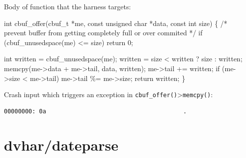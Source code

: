 \documentclass[
  a4paper,
]{scrreprt}
\newenvironment{Shaded}{\begin{snugshade}}{\end{snugshade}}
\newcommand{\CommentTok}[1]{\textcolor[rgb]{0.41,0.41,0.41}{#1}}
\newcommand{\ControlFlowTok}[1]{\textcolor[rgb]{0.85,0.12,0.09}{#1}}
\newcommand{\DataTypeTok}[1]{\textcolor[rgb]{0.47,0.16,0.63}{#1}}
\newcommand{\DecValTok}[1]{\textcolor[rgb]{0.47,0.16,0.63}{#1}}
\newcommand{\NormalTok}[1]{\textcolor[rgb]{0.33,0.33,0.33}{#1}}
\newcommand{\OperatorTok}[1]{\textcolor[rgb]{0.00,0.46,0.62}{#1}}
\theoremstyle{definition}
\theoremstyle{remark}
\begin{document}
Body of function that the harness targets:

\begin{Shaded}
\begin{Highlighting}[numbers=left,,]
\DataTypeTok{int}\NormalTok{ cbuf\_offer}\OperatorTok{(}\NormalTok{cbuf\_t }\OperatorTok{*}\NormalTok{me}\OperatorTok{,} \DataTypeTok{const} \DataTypeTok{unsigned} \DataTypeTok{char} \OperatorTok{*}\NormalTok{data}\OperatorTok{,} \DataTypeTok{const} \DataTypeTok{int}\NormalTok{ size}\OperatorTok{)}
\OperatorTok{\{}
    \CommentTok{/* prevent buffer from getting completely full or over commited */}
    \ControlFlowTok{if} \OperatorTok{(}\NormalTok{cbuf\_unusedspace}\OperatorTok{(}\NormalTok{me}\OperatorTok{)} \OperatorTok{\textless{}=}\NormalTok{ size}\OperatorTok{)}
        \ControlFlowTok{return} \DecValTok{0}\OperatorTok{;}

    \DataTypeTok{int}\NormalTok{ written }\OperatorTok{=}\NormalTok{ cbuf\_unusedspace}\OperatorTok{(}\NormalTok{me}\OperatorTok{);}
\NormalTok{    written }\OperatorTok{=}\NormalTok{ size }\OperatorTok{\textless{}}\NormalTok{ written }\OperatorTok{?}\NormalTok{ size }\OperatorTok{:}\NormalTok{ written}\OperatorTok{;}
\NormalTok{    memcpy}\OperatorTok{(}\NormalTok{me}\OperatorTok{{-}\textgreater{}}\NormalTok{data }\OperatorTok{+}\NormalTok{ me}\OperatorTok{{-}\textgreater{}}\NormalTok{tail}\OperatorTok{,}\NormalTok{ data}\OperatorTok{,}\NormalTok{ written}\OperatorTok{);}
\NormalTok{    me}\OperatorTok{{-}\textgreater{}}\NormalTok{tail }\OperatorTok{+=}\NormalTok{ written}\OperatorTok{;}
    \ControlFlowTok{if} \OperatorTok{(}\NormalTok{me}\OperatorTok{{-}\textgreater{}}\NormalTok{size }\OperatorTok{\textless{}}\NormalTok{ me}\OperatorTok{{-}\textgreater{}}\NormalTok{tail}\OperatorTok{)}
\NormalTok{        me}\OperatorTok{{-}\textgreater{}}\NormalTok{tail }\OperatorTok{\%=}\NormalTok{ me}\OperatorTok{{-}\textgreater{}}\NormalTok{size}\OperatorTok{;}
    \ControlFlowTok{return}\NormalTok{ written}\OperatorTok{;}
\OperatorTok{\}}
\end{Highlighting}
\end{Shaded}

Crash input which triggers an exception in
\texttt{cbuf\_offer()}\textgreater{}\texttt{memcpy()}:

\begin{verbatim}
00000000: 0a                                       .
\end{verbatim}

\section{dvhar/dateparse}\label{dvhardateparse}
\end{document}
